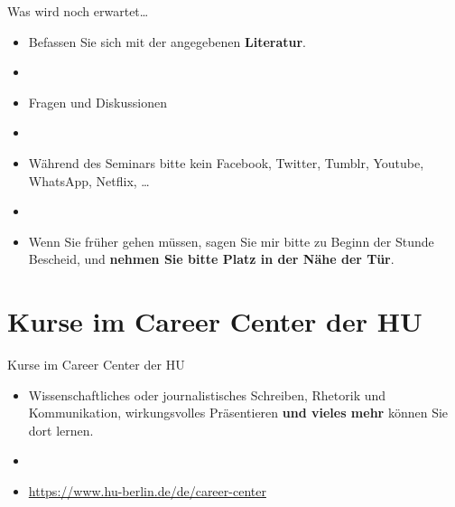 \begin{frame}

Was wird noch erwartet\dots

\begin{itemize}
	\item Befassen Sie sich mit der angegebenen \textbf{Literatur}.
	\item[]
	\item Fragen und Diskussionen
	\item[]	
	\item Während des Seminars bitte kein Facebook, Twitter, Tumblr,
	Youtube, WhatsApp, Netflix, \dots
	\item[]	
	\item Wenn Sie früher gehen müssen, sagen Sie mir bitte zu Beginn der
	Stunde Bescheid, und \textbf{nehmen Sie bitte Platz in der Nähe der Tür}.
	
\end{itemize}

\end{frame}


\section{Kurse im Career Center der HU}

\begin{frame}{Kurse im Career Center der HU}

\begin{itemize}
	\item Wissenschaftliches oder journalistisches Schreiben, Rhetorik und Kommunikation, wirkungsvolles Präsentieren \textbf{und vieles mehr} können Sie dort lernen.
	
	\item[]
	
	\item[] \url{https://www.hu-berlin.de/de/career-center}
	
\end{itemize}		

\end{frame}


